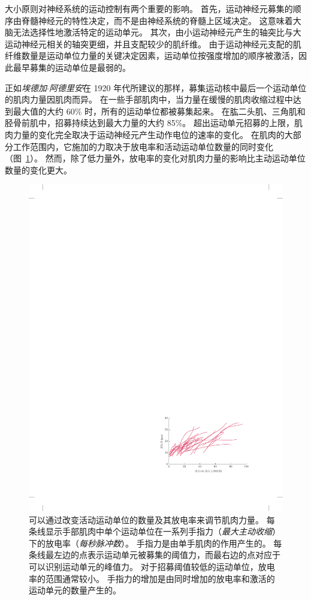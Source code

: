 大小原则对神经系统的运动控制有两个重要的影响。
首先，运动神经元募集的顺序由脊髓神经元的特性决定，而不是由神经系统的脊髓上区域决定。
这意味着大脑无法选择性地激活特定的运动单元。
其次，由小运动神经元产生的轴突比与大运动神经元相关的轴突更细，并且支配较少的肌纤维。
由于运动神经元支配的肌纤维数量是运动单位力量的关键决定因素，运动单位按强度增加的顺序被激活，因此最早募集的运动单位是最弱的。


正如\textit{埃德加$\cdot$阿德里安}在 1920 年代所建议的那样，募集运动核中最后一个运动单位的肌肉力量因肌肉而异。
在一些手部肌肉中，当力量在缓慢的肌肉收缩过程中达到最大值的大约 60\% 时，所有的运动单位都被募集起来。
在肱二头肌、三角肌和胫骨前肌中，招募持续达到最大力量的大约 85\%。
超出运动单元招募的上限，肌肉力量的变化完全取决于运动神经元产生动作电位的速率的变化。
在肌肉的大部分工作范围内，它施加的力取决于放电率和活动运动单位数量的同时变化（图~\ref{fig:31_7}）。
然而，除了低力量外，放电率的变化对肌肉力量的影响比主动运动单位数量的变化更大。


\begin{figure}[htbp]
	\centering
	\includegraphics[width=0.63\linewidth]{chap31/fig_31_7}
	\caption{可以通过改变活动运动单位的数量及其放电率来调节肌肉力量。
	每条线显示手部肌肉中单个运动单位在一系列手指力（\textit{最大主动收缩}）下的放电率（\textit{每秒脉冲数}）。
	手指力是由单手肌肉的作用产生的。
	每条线最左边的点表示运动单元被募集的阈值力，而最右边的点对应于可以识别运动单元的峰值力。
	对于招募阈值较低的运动单位，放电率的范围通常较小。
	手指力的增加是由同时增加的放电率和激活的运动单元的数量产生的\cite{moritz2005discharge}。}
	\label{fig:31_7}
\end{figure}


